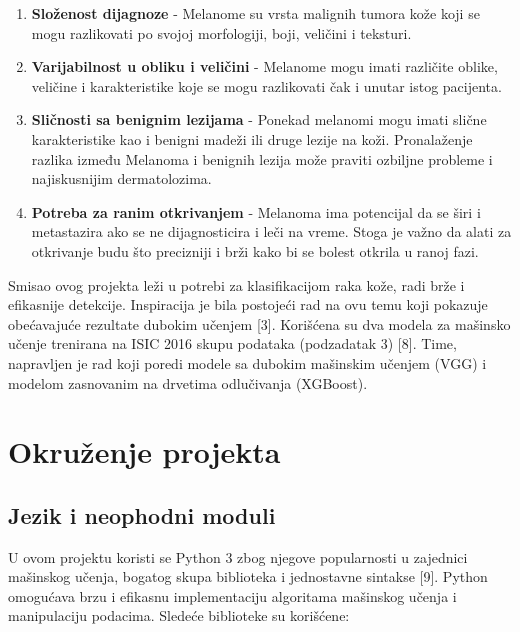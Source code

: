 \documentclass{article}
\begin{document}
\begin{enumerate}
    \item \textbf {Složenost dijagnoze} - Melanome su vrsta malignih tumora kože koji se mogu razlikovati po svojoj morfologiji, boji, veličini i teksturi.
    \item \textbf {Varijabilnost u obliku i veličini} - Melanome mogu imati različite oblike, veličine i karakteristike koje se mogu razlikovati čak i unutar istog pacijenta.
    \item \textbf {Sličnosti sa benignim lezijama} - Ponekad melanomi mogu imati slične karakteristike kao i benigni madeži ili druge lezije na koži. Pronalaženje razlika između Melanoma i benignih lezija može praviti ozbiljne probleme i najiskusnijim dermatolozima.
    \item \textbf {Potreba za ranim otkrivanjem} - Melanoma ima potencijal da se širi i metastazira ako se ne dijagnosticira i leči na vreme. Stoga je važno da alati za otkrivanje budu što precizniji i brži kako bi se bolest otkrila u ranoj fazi.
\end{enumerate}

\par
Smisao ovog projekta leži u potrebi za klasifikacijom raka kože, radi brže i efikasnije detekcije. Inspiracija je bila postojeći rad na ovu temu koji pokazuje obećavajuće rezultate dubokim učenjem [3]. Korišćena su dva modela za mašinsko učenje trenirana na ISIC 2016 skupu podataka (podzadatak 3) [8]. Time, napravljen je rad koji poredi modele sa dubokim mašinskim učenjem (VGG) i modelom zasnovanim na drvetima odlučivanja (XGBoost).  

\section{Okruženje projekta}

\subsection{Jezik i neophodni moduli}
U ovom projektu koristi se Python 3 zbog njegove popularnosti u zajednici mašinskog učenja, bogatog skupa biblioteka i jednostavne sintakse [9]. Python omogućava brzu i efikasnu implementaciju algoritama mašinskog učenja i manipulaciju podacima. Sledeće biblioteke su korišćene:
\end{document}
